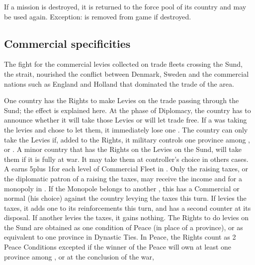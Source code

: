 \aparag If a mission is destroyed, it is returned to the force pool of its
country and may be used again.
\bparag Exception:  is removed from game if destroyed.

\subsection{Commercial specificities}
\label{chSpecific:Commercial specificities}
\label{chSpecific:Sund Levies}
\begin{designnote}
  The fight for the commercial levies collected on trade fleets crossing the
  Sund, the  strait, nourished the conflict between Denmark,
  Sweden and the commercial nations such as England and Holland that dominated
  the trade of the area.
\end{designnote}
\aparag One country has the Rights to make Levies on the trade passing through
the Sund; the effect is explained here.
\bparag At the phase of Diplomacy, the country has to announce whether it will
take those Levies or will let trade free.
\bparag If a \MAJ was taking the levies and chose to let them, it immediately
lose one \STAB.
\bparag The country can only take the Levies if, added to the Rights, it
military controls one province among ,
 or .
\bparag A minor country that has the Rights on the Levies on the Sund, will
take them if it is fully at war. It may take them at controller's choice in
others cases.
\bparag A \MAJ earns 5\ducats plus 1\ducats for each level of Commercial Fleet
in .
\bparag Only the \MAJ raising taxes, or the diplomatic patron of a \MIN
raising the taxes, may receive the income and \PV for a monopoly in
. If the Monopole belongs to another \MAJ, this \MAJ has a
Commercial or normal \CB (his choice) against the country levying the taxes
this turn.
\bparag If  levies the taxes, it adds one \LD to its
reinforcements this turn, and has a second \ARMY counter at its disposal.
\bparag If another \MIN levies the taxes, it gains nothing.
\bparag The Rights to do levies on the Sund are obtained as one condition of
Peace (in place of a province), or as equivalent to one province in Dynastic
Ties.
\bparag In Peace, the Rights count as 2 Peace Conditions excepted if the
winner of the Peace will own at least one province among ,
 or  at the conclusion of the war,
